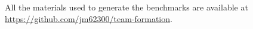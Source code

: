 \documentclass[conference]{IEEEtran}
\theoremstyle{definition}
\begin{document}

All the materials used to generate the benchmarks are available at \url{https://github.com/jm62300/team-formation}.


 

\end{document}
